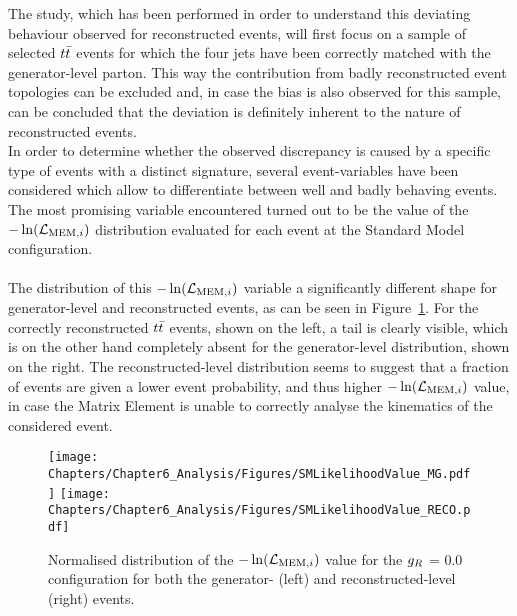 The study, which has been performed in order to understand this deviating behaviour observed for reconstructed events, will first focus on a sample of selected $t\bar{t}$ events for which the four jets have been correctly matched with the generator-level parton.
This way the contribution from badly reconstructed event topologies can be excluded and, in case the bias is also observed for this sample, can be concluded that the deviation is definitely inherent to the nature of reconstructed events.
\\
In order to determine whether the observed discrepancy is caused by a specific type of events with a distinct signature, several event-variables have been considered which allow to differentiate between well and badly behaving events.
The most promising variable encountered turned out to be the value of the $-\ln(\mathcal{L}_{\textrm{MEM}, i})$ distribution evaluated for each event at the Standard Model configuration.
\\
\\
The distribution of this $-\ln(\mathcal{L}_{\textrm{MEM}, i})$ variable a significantly different shape for generator-level and reconstructed events, as can be seen in Figure~\ref{fig::SMLik}.
For the correctly reconstructed $t\bar{t}$ events, shown on the left, a tail is clearly visible, which is on the other hand completely absent for the generator-level distribution, shown on the right.
The reconstructed-level distribution seems to suggest that a fraction of events are given a lower event probability, and thus higher $-\ln(\mathcal{L}_{\textrm{MEM}, i})$ value, in case the Matrix Element is unable to correctly analyse the kinematics of the considered event.
\\
\begin{figure}[h!t]
 \centering
 \texttt{[image: Chapters/Chapter6\_Analysis/Figures/SMLikelihoodValue\_MG.pdf]} \hspace{0.3cm}
 \texttt{[image: Chapters/Chapter6\_Analysis/Figures/SMLikelihoodValue\_RECO.pdf]}
 \caption{Normalised distribution of the $-\ln(\mathcal{L}_{\textrm{MEM}, i})$ value for the $g_{R}$ = $0.0$ configuration for both the generator- (left) and reconstructed-level (right) events.} \label{fig::SMLik}
\end{figure}

